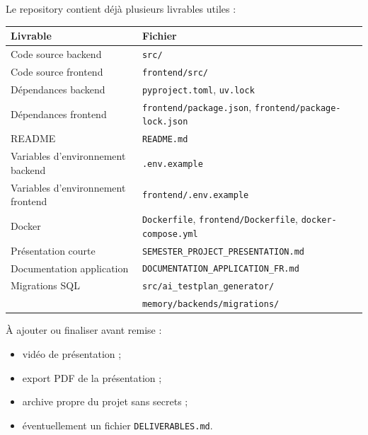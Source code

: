 \documentclass[
  french,
]{report}
\newcounter{none} %
\providecommand{\tightlist}{%
  \setlength{\itemsep}{0pt}\setlength{\parskip}{0pt}}
\begin{document}
Le repository contient déjà plusieurs livrables utiles :

{\def\LTcaptype{none} %
\begin{longtable}[]{@{}
  >{\raggedright\arraybackslash}p{}
  >{\raggedright\arraybackslash}p{}@{}}
\toprule\noalign{}
\begin{minipage}[b]{\linewidth}\raggedright
Livrable
\end{minipage} & \begin{minipage}[b]{\linewidth}\raggedright
Fichier
\end{minipage} \\
\midrule\noalign{}
\endhead
\bottomrule\noalign{}
\endlastfoot
Code source backend & \texttt{src/} \\
Code source frontend & \texttt{frontend/src/} \\
Dépendances backend & \texttt{pyproject.toml}, \texttt{uv.lock} \\
Dépendances frontend & \texttt{frontend/package.json},
\texttt{frontend/package-lock.json} \\
README & \texttt{README.md} \\
Variables d'environnement backend & \texttt{.env.example} \\
Variables d'environnement frontend & \texttt{frontend/.env.example} \\
Docker & \texttt{Dockerfile}, \texttt{frontend/Dockerfile},
\texttt{docker-compose.yml} \\
Présentation courte & \texttt{SEMESTER\_PROJECT\_PRESENTATION.md} \\
Documentation application &
\texttt{DOCUMENTATION\_APPLICATION\_FR.md} \\
Migrations SQL &
\texttt{src/ai\_testplan\_generator/}\\
& \texttt{memory/backends/migrations/} \\
\end{longtable}
}

À ajouter ou finaliser avant remise :

\begin{itemize}
\tightlist
\item
  vidéo de présentation ;
\item
  export PDF de la présentation ;
\item
  archive propre du projet sans secrets ;
\item
  éventuellement un fichier \texttt{DELIVERABLES.md}.
\end{itemize}
\end{document}
